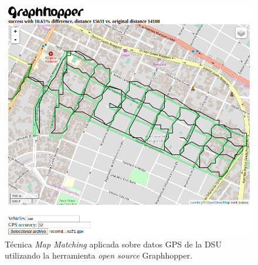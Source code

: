 \begin{figure}[htbp]
    \centering
    \includegraphics[width=\textwidth]{graphhopper71.png}
    \caption{Técnica \textit{Map Matching} aplicada sobre datos GPS de la DSU utilizando la herramienta \textit{open source} Graphhopper.}
    \label{fig:mapMatching}
\end{figure}

